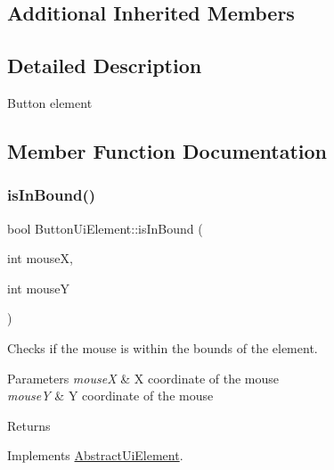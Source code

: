 \subsection*{Additional Inherited Members}


\subsection{Detailed Description}
Button element 



\subsection{Member Function Documentation}
\mbox{\label{class_button_ui_element_ab321d646770df66f7ea58a7246d7bf28}} 
\subsubsection{\texorpdfstring{is\+In\+Bound()}{isInBound()}}
{\footnotesize\ttfamily bool Button\+Ui\+Element\+::is\+In\+Bound (\begin{DoxyParamCaption}\item[{int}]{mouseX,  }\item[{int}]{mouseY }\end{DoxyParamCaption})\hspace{0.3cm}{\ttfamily [virtual]}}



Checks if the mouse is within the bounds of the element. 


\begin{DoxyParams}{Parameters}
{\em mouseX} & X coordinate of the mouse\\
\hline
{\em mouseY} & Y coordinate of the mouse\\
\hline
\end{DoxyParams}
\begin{DoxyReturn}{Returns}

\end{DoxyReturn}


Implements \mbox{\hyperlink{class_abstract_ui_element_ad2c415461cd7e8c1ee50b1105eb84685}{Abstract\+Ui\+Element}}.

\mbox{\label{class_button_ui_element_a06c748ef9e81216f76d7db936d320365}} 
